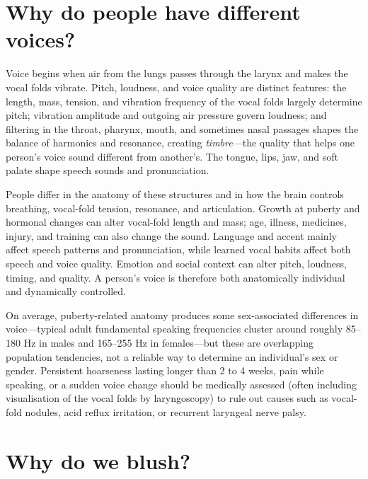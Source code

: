 \documentclass[11pt,oneside]{report}
\begin{document}
\section{Why do people have different voices?}

Voice begins when air from the lungs passes through the larynx and makes the
vocal folds vibrate. Pitch, loudness, and voice quality are distinct features:
the length, mass, tension, and vibration frequency of the vocal folds largely
determine pitch; vibration amplitude and outgoing air pressure govern loudness;
and filtering in the throat, pharynx, mouth, and sometimes nasal passages
shapes the balance of harmonics and resonance, creating \emph{timbre}---the
quality that helps one person's voice sound different from another's. The
tongue, lips, jaw, and soft palate shape speech sounds and pronunciation.

People differ in the anatomy of these structures and in how the brain controls
breathing, vocal-fold tension, resonance, and articulation. Growth at puberty
and hormonal changes can alter vocal-fold length and mass; age, illness,
medicines, injury, and training can also change the sound. Language and accent
mainly affect speech patterns and pronunciation, while learned vocal habits
affect both speech and voice quality. Emotion and social context can alter
pitch, loudness, timing, and quality. A person's voice is therefore both
anatomically individual and dynamically controlled.

On average, puberty-related anatomy produces some sex-associated differences in
voice—typical adult fundamental speaking frequencies cluster around roughly
85--180 Hz in males and 165--255 Hz in females—but these are overlapping
population tendencies, not a reliable way to determine an individual's sex or
gender. Persistent hoarseness lasting longer than 2 to 4 weeks, pain while
speaking, or a sudden voice change should be medically assessed (often including
visualisation of the vocal folds by laryngoscopy) to rule out causes such as
vocal-fold nodules, acid reflux irritation, or recurrent laryngeal nerve palsy.

\section{Why do we blush?}
\end{document}
